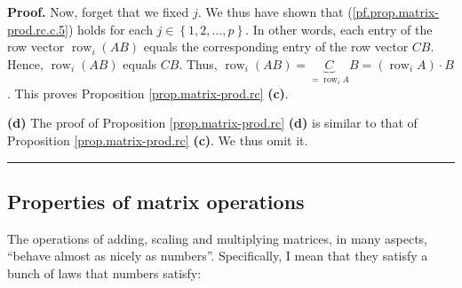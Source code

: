 \documentclass[numbers=enddot,12pt,final,onecolumn,notitlepage]{scrartcl}%
\theoremstyle{definition}
\newenvironment{proof}[1][Proof]{\noindent\textbf{#1.} }{\ \rule{0.5em}{0.5em}}
\begin{document}
\begin{proof}
Now, forget that we fixed $j$. We thus have shown that
(\ref{pf.prop.matrix-prod.rc.c.5}) holds for each $j\in\left\{  1,2,\ldots
,p\right\}  $. In other words, each entry of the row vector
$\operatorname*{row}\nolimits_{i}\left(  AB\right)  $ equals the corresponding
entry of the row vector $CB$. Hence, $\operatorname*{row}\nolimits_{i}\left(
AB\right)  $ equals $CB$. Thus, $\operatorname*{row}\nolimits_{i}\left(
AB\right)  =\underbrace{C}_{=\operatorname*{row}\nolimits_{i}A}B=\left(
\operatorname*{row}\nolimits_{i}A\right)  \cdot B$. This proves Proposition
\ref{prop.matrix-prod.rc} \textbf{(c)}.

\textbf{(d)} The proof of Proposition \ref{prop.matrix-prod.rc} \textbf{(d)}
is similar to that of Proposition \ref{prop.matrix-prod.rc} \textbf{(c)}. We
thus omit it.
\end{proof}

\subsection{Properties of matrix operations}

The operations of adding, scaling and multiplying matrices, in many aspects,
\textquotedblleft behave almost as nicely as numbers\textquotedblright.
Specifically, I mean that they satisfy a bunch of laws that numbers satisfy:
\end{document}
